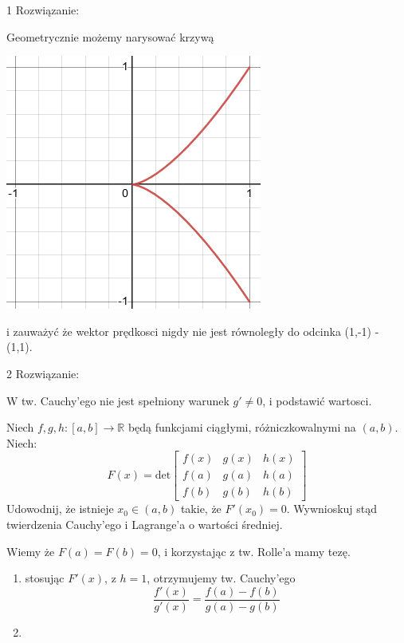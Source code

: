 \documentclass[11pt]{scrartcl}
\begin{document}
  1 Rozwiązanie:

  Geometrycznie możemy narysować krzywą

  \begin{center}
    \includegraphics{krzywa}
  \end{center}
  
  i zauważyć że wektor prędkosci nigdy nie jest równoległy do odcinka (1,-1) - (1,1).

  2 Rozwiązanie:

  W tw. Cauchy'ego nie jest spełniony warunek $g' \not = 0$, i podstawić wartosci.

  \begin{zadanie}
    Niech $f,g,h : \left [ a, b \right ] \to \mathbb{R} $ będą funkcjami ciągłymi, różniczkowalnymi na $(a, b)$. Niech:
    \[
      F(x) = \text{det}
        \begin{bmatrix}
          f(x) & g(x) & h(x)  \\
          f(a) & g(a)  & h(a)   \\
          f(b) & g(b) & h(b) 
        \end{bmatrix}
    \]
    Udowodnij, że istnieje $x_{0} \in (a, b)$ takie, że $F'(x_{0}) = 0$. Wywnioskuj stąd twierdzenia Cauchy’ego i Lagrange’a o wartości średniej.
  \end{zadanie}
  
  Wiemy że $F(a) = F(b) = 0$, i korzystając z tw. Rolle'a mamy tezę.
  \begin{enumerate}
      \item stosując $F'(x)$, z $h = 1$, otrzymujemy tw. Cauchy'ego
        \[
            \frac{f'(x)}{g'(x)} = \frac{f(a) - f(b)}{g(a) - g(b)}
        \]
        
      \item  
  \end{enumerate}
\end{document}
